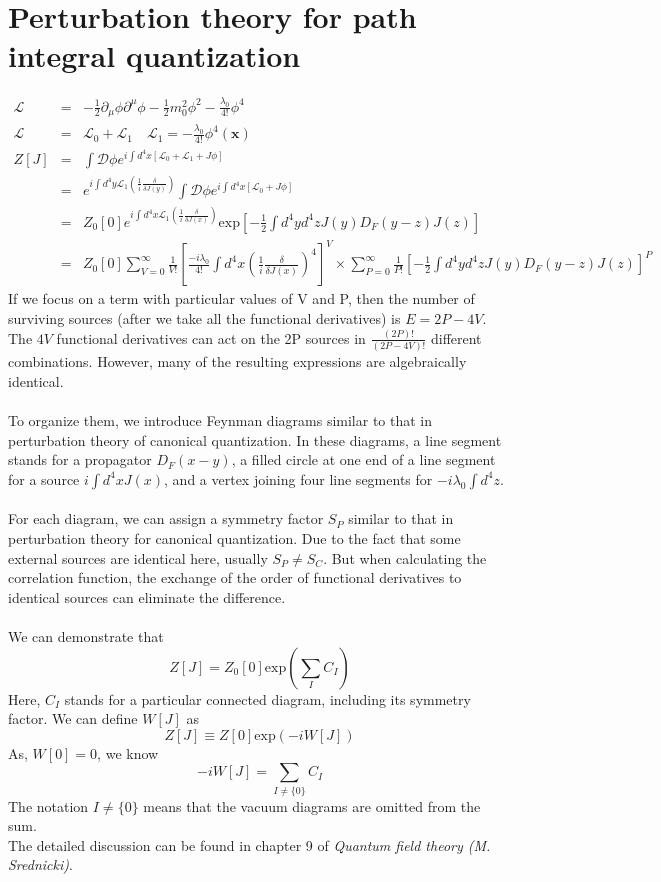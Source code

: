 \documentclass[cyan]{elegantnote}
\begin{document}
\section{Perturbation theory for path integral quantization}
\begin{eqnarray}
\mathcal{L} &=& -\frac{1}{2}\partial_{\mu} \phi \partial^{\mu} \phi -\frac{1}{2}m_0^2 \phi^2 -\frac{\lambda_0}{4!}\phi^4 \nonumber \\
\mathcal{L} &=& \mathcal{L}_0 + \mathcal{L}_1 \quad \mathcal{L}_1 =- \frac{\lambda_0}{4!} \phi^4 (\bm{x}) \nonumber \\
Z[J] &=& \int \mathcal{D}\phi e^{i\int d^4x [\mathcal{L}_0 + \mathcal{L}_1 + J\phi]} \nonumber \\
&=& e^{i\int d^4y \mathcal{L}_1(\frac{1}{i} \frac{\delta}{\delta J(y)})} \int \mathcal{D}\phi e^{i\int d^4x [\mathcal{L}_0 + J\phi]} \nonumber \\
& = & Z_0[0]e^{i\int d^4x \mathcal{L}_1(\frac{1}{i} \frac{\delta}{\delta J(x)})} \mathrm{exp} [-\frac{1}{2} \int d^4y d^4z J(y)D_F(y-z)J(z)] \nonumber \\
& =& Z_0[0]\sum_{V=0}^{\infty} \frac{1}{V!} [ \frac{-i\lambda_0}{4!} \int d^4x (\frac{1}{i} \frac{\delta}{\delta J(x)})^4]^V \times \sum_{P=0}^{\infty} \frac{1}{P!} [-\frac{1}{2} \int d^4y d^4z J(y)D_F(y-z)J(z)]^P \nonumber
\end{eqnarray}
If we focus on a term with particular values of V and P, then
the number of surviving sources (after we take all the functional derivatives) is $E = 2P-4V$. The $4V$ functional derivatives can act on the 2P sources in $\frac{(2P)!}{(2P-4V)!}$ different combinations. However, many of the resulting expressions are algebraically identical.\\ \\
To organize them, we introduce Feynman diagrams similar to that in perturbation theory of canonical quantization. In these diagrams, a line segment stands for a propagator $D_F(x-y)$, a filled circle at one end of a line segment for a source $i\int d^4x J(x)$, and a vertex joining four line segments for $-i\lambda_0 \int d^4 z$.\\ \\
For each diagram, we can assign a symmetry factor $S_P$ similar to that in perturbation theory for canonical quantization. Due to the fact that some external sources are identical here, usually $S_P \neq S_C$. But when calculating the correlation function, the exchange of the order of functional derivatives to identical sources can eliminate the difference.\\ \\
We can demonstrate that
\[Z[J] = Z_0[0] \mathrm{exp}(\sum_I C_I)\]
Here, $C_I$ stands for a particular connected diagram, including its symmetry factor. We can define $W[J]$ as
\[Z[J] \equiv Z[0] \mathrm{exp}(-iW[J])\]
As, $W[0]=0$, we know
\[-iW[J] = \sum_{I \neq \{0\}} C_I\]
The notation $I\neq \{0\}$ means that the vacuum diagrams are omitted from the sum.\\
The detailed discussion can be found in chapter 9 of \emph{Quantum field theory (M. Srednicki)}.
\end{document}
